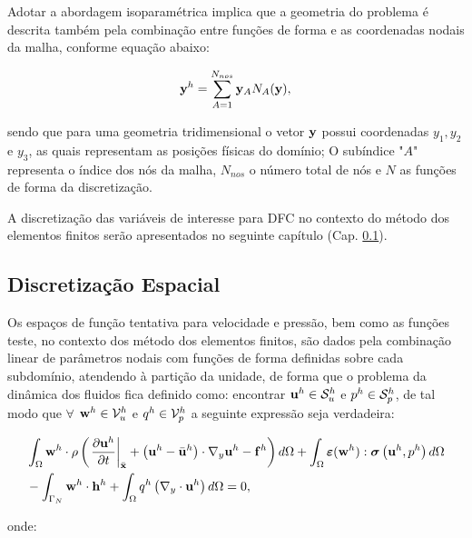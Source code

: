 \documentclass[tese_patricia]{subfiles}%
\begin{document}
Adotar a abordagem isoparamétrica implica que a geometria do problema é descrita também pela combinação entre funções de forma e as coordenadas nodais da malha, conforme equação abaixo:

\begin{align}
	\mathbf{y}^{h} = \sum_{A = 1}^{N_{nos}} \mathbf{y}_{A}N_{A}(\mathbf{y}),
\end{align}

\noindent sendo que para uma geometria tridimensional o vetor $\mathbf{y}$ possui coordenadas $y_1,y_2$ e $y_3$, as quais representam as posições físicas do domínio; O subíndice "$A$"  representa o índice dos nós da malha, $N_{nos}$ o número total de nós e $N$ as funções de forma da discretização.

A discretização das variáveis de interesse para DFC no contexto do método dos elementos finitos serão apresentados no seguinte capítulo (Cap. \ref{capitulo:Cap2:DiscEspacial}).


\subsection{Discretização Espacial} \label{capitulo:Cap2:DiscEspacial}

Os espaços de função tentativa para velocidade e pressão, bem como as funções teste, no contexto dos método dos elementos finitos, são dados pela combinação linear de parâmetros nodais com funções de forma definidas sobre cada subdomínio, atendendo à partição da unidade, de forma que o problema da dinâmica dos fluidos fica definido como: encontrar $\mathbf{u}^h \in \mathcal{S}_u^h$ e $p^h \in \mathcal{S}_p^h$, de tal modo que $\forall$ $\mathbf{w}^h \in \mathcal{V}_u^h$ e $q^h \in \mathcal{V}_p^h$ a seguinte expressão seja verdadeira:

\begin{align}
	\begin{split}
		&\int_{\Omega} \mathbf{w}^h \cdot \rho \left(\left. \frac{\partial\mathbf{u}^h}{\partial t} \right|_{\bar{\mathbf{x}}} + \left(\mathbf{u}^h - \bar{\mathbf{u}}^h \right)\cdot\nabla_y \mathbf{u}^h - \mathbf{f}^{h}\right) d\Omega + \int_{\Omega} \bm{\varepsilon}(\mathbf{w}^h) : \boldsymbol{\sigma}\left(\mathbf{u}^h,p^h \right)  d\Omega\\ & - \int_{\Gamma_{N}} \mathbf{w}^h \cdot \mathbf{h}^{h} + \int_{\Omega} q^h \left(\nabla_y \cdot \mathbf{u}^h\right) d \Omega = 0,  \label{eq:NSWeakForm2} 
	\end{split}
\end{align}

\noindent onde:
\end{document}
